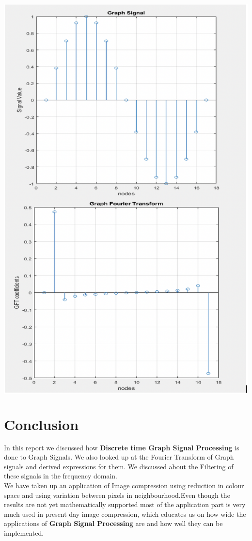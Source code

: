 \documentclass[12pt,onecolumn]{article}
\begin{document}
\includegraphics{images/original.png}
\newline
\section{\textbf{Conclusion}}
In this report we discussed how \textbf{Discrete time Graph Signal Processing} is done to Graph Signals. We also looked up at the Fourier Transform of Graph signals and derived expressions for them.
We discussed about the Filtering of these signals in the frequency domain.\\
We have taken up an application of Image compression using reduction in colour space and using variation between pixels in neighbourhood.Even though the results are not yet mathematically supported most of the application part is very much used in present day image compression, which educates us on how wide the applications of \textbf{Graph Signal Processing} are and how well they can be implemented.\\  
\end{document}
